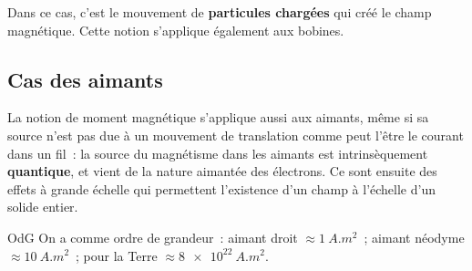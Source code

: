 \documentclass[../main/main.tex]{subfiles}
\begin{document}
Dans ce cas, c'est le mouvement de \textbf{particules chargées} qui créé le
champ magnétique. Cette notion s'applique également aux bobines.

\subsection{Cas des aimants}
\label{ssec:magaim}
La notion de moment magnétique s'applique aussi aux aimants, même si sa source
n'est pas due à un mouvement de translation comme peut l'être le courant dans un
fil~: la source du magnétisme dans les aimants est intrinsèquement
\textbf{quantique}, et vient de la nature aimantée des électrons. Ce sont
ensuite des effets à grande échelle qui permettent l'existence d'un champ à
l'échelle d'un solide entier.

\begin{rexem}{OdG}
  On a comme ordre de grandeur~: aimant droit $\approx \SI{1}{A.m^2}$~; aimant
  néodyme $\approx \SI{10}{A.m^2}$~; pour la Terre $\approx \SI{8e22}{A.m^2}$.
\end{rexem}
\end{document}
